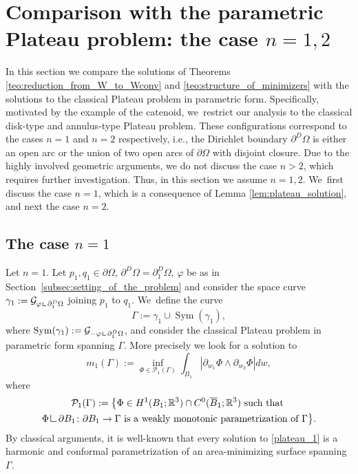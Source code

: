 \documentclass[11pt]{article}
\newcommand{\ie}{i.e.,\xspace}
\numberwithin{equation}{section}
\DeclareMathOperator{\Sym}{Sym}
\newcommand{\R}{\mathbb{R}}
\let\Om\Omega
\newcommand{\resa}{\mathop{\hbox{\vrule height 7pt width 0.5pt depth 0pt
\vrule height 0.5pt width 6pt depth 0pt}}\nolimits}
\newcommand{\resb}{\mathop{\hbox{\vrule height 4pt width 0.5pt depth 0pt
\vrule height 0.5pt width 3pt depth 0pt}}\nolimits}
\newcommand{\res}{\mathchoice{\resa}{\resa}{\resb}{\resb}}
\theoremstyle{definition}
\begin{document}
\section{Comparison with the parametric Plateau problem: the case \texorpdfstring{$n=1,2$}{12}}
\label{sec:comparison_with_the_parametric_Plateau_problem:the_case_n=1,2}

In this section we compare the solutions of
Theorems \ref{teo:reduction_from_W_to_Wconv} and \ref{teo:structure_of_minimizers} with the solutions to the classical Plateau problem in parametric form.
Specifically, motivated by the example of the catenoid, we~restrict our analysis to the classical
disk-type and annulus-type Plateau problem.
These configurations correspond to the cases $n=1$ and $n=2$ respectively, \ie the Dirichlet boundary $\partial^D\Om$ is either an open arc or
the union of two open arcs of $\partial\Om$ with disjoint closure.
Due to the highly involved geometric arguments,
we do not discuss the case $n>2$, which requires further investigation.
Thus, in this section we assume $n=1,2$. We~first discuss the case $n=1$, which is a consequence of
Lemma \ref{lem:plateau_solution}, and next the case $n=2$.

\subsection{The case $n=1$}\label{sec:the_case_n=1}

Let $n=1$. Let $p_1,q_1\in\partial\Om$, $\partial^D\Om=\partial^D_1\Om$, $\varphi$ be as in Section~\ref{subsec:setting_of_the_problem} and
consider the space curve $\gamma_1:=\mathcal{G}_{\varphi\res\partial_1^D\Om}$ joining $p_1$ to $q_1$. We~define the curve
\[
\Gamma:=\gamma_1\cup \Sym(\gamma_1),
\]
where $\Sym(\gamma_1):=\mathcal{G}_{-\varphi\res\partial_1^D\Om}$,
and
consider the classical Plateau problem in parametric form
spanning $\Gamma$. More precisely we look for a solution to
\begin{equation}\label{plateau_1}
m_1(\Gamma):=\inf_{\Phi\in\mathcal{P}_1(\Gamma)}\int_{B_1}|\partial_{w_1}\Phi\wedge\partial_{w_2}\Phi|dw,
\end{equation}
where
\begin{multline}\label{def:adm_Phi}
\mathcal{P}_1(\Gamma):=\bigl\{\Phi\in H^1( B_1;\R^3)\cap C^0(\overline B_1;\R^3)\text{ such that }\\\Phi\res\partial B_1\colon\partial B_1\to\Gamma \text{ is a weakly monotonic parametrization of $\Gamma$}
\bigr\}.
\end{multline}
By classical arguments, it is well-known that
every solution to \eqref{plateau_1} is a harmonic and conformal parametrization of an area-minimizing surface spanning $\Gamma$.
\end{document}
